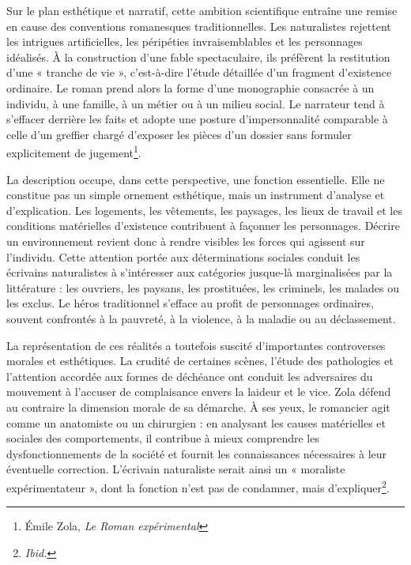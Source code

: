 Sur le plan esthétique et narratif, cette ambition scientifique entraîne une remise en cause des conventions romanesques traditionnelles. Les naturalistes rejettent les intrigues artificielles, les péripéties invraisemblables et les personnages idéalisés. À la construction d’une fable spectaculaire, ils préfèrent la restitution d’une « tranche de vie », c’est-à-dire l’étude détaillée d’un fragment d’existence ordinaire. Le roman prend alors la forme d’une monographie consacrée à un individu, à une famille, à un métier ou à un milieu social. Le narrateur tend à s’effacer derrière les faits et adopte une posture d’impersonnalité comparable à celle d’un greffier chargé d’exposer les pièces d’un dossier sans formuler explicitement de jugement\footnote{Émile Zola, \textit{Le Roman expérimental}}.

La description occupe, dans cette perspective, une fonction essentielle. Elle ne constitue pas un simple ornement esthétique, mais un instrument d’analyse et d’explication. Les logements, les vêtements, les paysages, les lieux de travail et les conditions matérielles d’existence contribuent à façonner les personnages. Décrire un environnement revient donc à rendre visibles les forces qui agissent sur l’individu. Cette attention portée aux déterminations sociales conduit les écrivains naturalistes à s’intéresser aux catégories jusque-là marginalisées par la littérature : les ouvriers, les paysans, les prostituées, les criminels, les malades ou les exclus. Le héros traditionnel s’efface au profit de personnages ordinaires, souvent confrontés à la pauvreté, à la violence, à la maladie ou au déclassement.

La représentation de ces réalités a toutefois suscité d’importantes controverses morales et esthétiques. La crudité de certaines scènes, l’étude des pathologies et l’attention accordée aux formes de déchéance ont conduit les adversaires du mouvement à l’accuser de complaisance envers la laideur et le vice. Zola défend au contraire la dimension morale de sa démarche. À ses yeux, le romancier agit comme un anatomiste ou un chirurgien : en analysant les causes matérielles et sociales des comportements, il contribue à mieux comprendre les dysfonctionnements de la société et fournit les connaissances nécessaires à leur éventuelle correction. L’écrivain naturaliste serait ainsi un « moraliste expérimentateur », dont la fonction n’est pas de condamner, mais d’expliquer\footnote{\textit{Ibid.}}.

